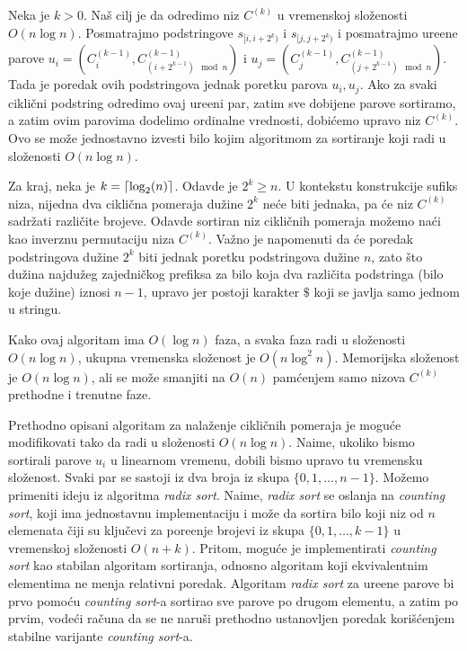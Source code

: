 Neka je $k>0$. Na\v s cilj je da odredimo niz $C^{(k)}$ u vremenskoj slo\v zenosti $O(n \log n)$. Posmatrajmo podstringove $s_{[i, i+2^k)}$ i $s_{[j, j+2^k)}$ i posmatrajmo ure\dj ene parove $u_i = (C^{(k-1)}_i, C^{(k-1)}_{(i+2^{k-1}) \mod n })$ i $u_j = (C^{(k-1)}_j, C^{(k-1)}_{(j+2^{k-1}) \mod n })$. Tada je poredak ovih podstringova jednak poretku parova $u_i, u_j$. Ako za svaki cikli\v cni podstring odredimo ovaj ure\dj eni par, zatim sve dobijene parove sortiramo, a zatim ovim parovima dodelimo ordinalne vrednosti, dobi\' cemo upravo niz $C^{(k)}$. Ovo se mo\v ze jednostavno izvesti bilo kojim algoritmom za sortiranje koji radi u slo\v zenosti $O(n \log n)$.

Za kraj, neka je $k = \left \lceil \log_2(n) \right \rceil$. Odavde je $2^k \geq n$. U kontekstu konstrukcije sufiks niza, nijedna dva cikli\v cna pomeraja du\v zine $2^k$ ne\' ce biti jednaka, pa \' ce niz $C^{(k)}$ sadr\v zati razli\v cite brojeve. Odavde sortiran niz cikli\v cnih pomeraja mo\v zemo na\' ci kao inverznu permutaciju niza $C^{(k)}$. Va\v zno je napomenuti da \' ce poredak podstringova du\v zine $2^k$ biti jednak poretku podstringova du\v zine $n$, zato \v sto du\v zina najdu\v zeg zajedni\v ckog prefiksa za bilo koja dva razli\v cita podstringa (bilo koje du\v zine) iznosi $n-1$, upravo jer postoji karakter $\$$ koji se javlja samo jednom u stringu.

Kako ovaj algoritam ima $O(\log n)$ faza, a svaka faza radi u slo\v zenosti $O(n \log n)$, ukupna vremenska slo\v zenost je $O(n \log^2 n)$. Memorijska slo\v zenost je $O(n \log n)$, ali se mo\v ze smanjiti na $O(n)$ pam\' cenjem samo nizova $C^{(k)}$ prethodne i trenutne faze.

\noindent
\begin{minipage}[l]{\textwidth}

\end{minipage}

Prethodno opisani algoritam za nala\v zenje cikli\v cnih pomeraja je mogu\' ce modifikovati tako da radi u slo\v zenosti $O(n \log n)$. Naime, ukoliko bismo sortirali parove $u_i$ u linearnom vremenu, dobili bismo upravo tu vremensku slo\v zenost. Svaki par se sastoji iz dva broja iz skupa $\{0, 1, \ldots, n-1\}$. Mo\v zemo primeniti ideju iz algoritma \textit{radix sort}. Naime, \textit{radix sort} se oslanja na \textit{counting sort}, koji ima jednostavnu implementaciju i mo\v ze da sortira bilo koji niz od $n$ elemenata \v ciji su klju\v cevi za pore\dj enje brojevi iz skupa $\{0, 1, \ldots, k-1\}$ u vremenskoj slo\v zenosti $O(n+k)$. Pritom, mogu\' ce je implementirati \textit{counting sort} kao stabilan algoritam sortiranja, odnosno algoritam koji ekvivalentnim elementima ne menja relativni poredak. Algoritam \textit{radix sort} za ure\dj ene parove bi prvo pomo\' cu \textit{counting sort}-a sortirao sve parove po drugom elementu, a zatim po prvim, vode\' ci ra\v cuna da se ne naru\v si prethodno ustanovljen poredak kori\v s\' cenjem stabilne varijante \textit{counting sort}-a.

